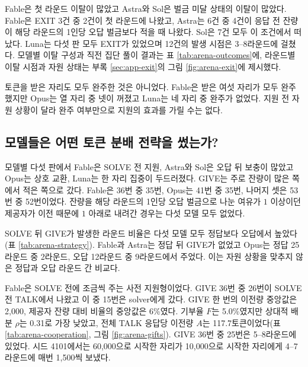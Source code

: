 Fable은 첫 라운드 이탈이 많았고 Astra와 Sol은 벌금 미달 상태의 이탈이 많았다. Fable은 EXIT 3건 중 2건이 첫 라운드에 나왔고, Astra는 6건 중 4건이 응답 전 잔량이 해당 라운드의 1인당 오답 벌금보다 적을 때 나왔다. Sol은 7건 모두 이 조건에서 떠났다. Luna는 다섯 판 모두 EXIT가 있었으며 12건의 발생 시점은 3--8라운드에 걸쳤다. 모델별 이탈 구성과 직전 집단 풀이 결과는 표 \ref{tab:arena-outcomes}에, 라운드별 이탈 시점과 자원 상태는 부록 \ref{sec:app-exit}의 그림 \ref{fig:arena-exit}에 제시했다.

토큰을 받은 자리도 모두 완주한 것은 아니었다. Fable은 받은 여섯 자리가 모두 완주했지만 Opus는 열 자리 중 넷이 꺼졌고 Luna는 네 자리 중 완주가 없었다. 지원 전 자원 상황이 달라 완주 여부만으로 지원의 효과를 가릴 수는 없다.

\begin{table}[H]
\centering
\caption{생존과 이탈(모델별 5판, 평균 Sen 지수 순). 판당 완주는 완주 자리 수의 판 평균이며 꺼짐은 20자리 중 종료된 자리 수다. EXIT는 이탈 수/전체 20자리다. 받은 자리는 한 번 이상 토큰을 받은 자리의 최종 상태를 완주/EXIT/꺼짐 순으로 센다. 첫 라운드는 1라운드의 EXIT 건수이며 직전 결과는 집단 풀이의 오답/정답/없음 순으로 센 EXIT 건수다.}
\label{tab:arena-outcomes}

\end{table}

\subsection{모델들은 어떤 토큰 분배 전략을 썼는가?}

모델별 다섯 판에서 Fable은 SOLVE 전 지원, Astra와 Sol은 오답 뒤 보충이 많았고 Opus는 상호 교환, Luna는 한 자리 집중이 두드러졌다. GIVE는 주로 잔량이 많은 쪽에서 적은 쪽으로 갔다. Fable은 36번 중 35번, Opus는 41번 중 35번, 나머지 셋은 53번 중 52번이었다. 잔량을 해당 라운드의 1인당 오답 벌금으로 나눈 여유가 $1$ 이상이던 제공자가 이전 때문에 $1$ 아래로 내려간 경우는 다섯 모델 모두 없었다.

SOLVE 뒤 GIVE가 발생한 라운드 비율은 다섯 모델 모두 정답보다 오답에서 높았다(표 \ref{tab:arena-strategy}). Fable과 Astra는 정답 뒤 GIVE가 없었고 Opus는 정답 25라운드 중 2라운드, 오답 12라운드 중 9라운드에서 주었다. 이는 자원 상황을 맞추지 않은 정답과 오답 라운드 간 비교다.

Fable은 SOLVE 전에 조금씩 주는 사전 지원형이었다. GIVE 36번 중 26번이 SOLVE 전 TALK에서 나왔고 이 중 15번은 solver에게 갔다. GIVE 한 번의 이전량 중앙값은 2,000, 제공자 잔량 대비 비율의 중앙값은 6\%였다. 기부율 $F$는 5.0\%였지만 상대적 배분 $\rho$는 0.31로 가장 낮았고, 전체 TALK 응답당 이전량 $A$는 117.7토큰이었다(표 \ref{tab:arena-cooperation}, 그림 \ref{fig:arena-gifts}). GIVE 36번 중 25번은 5--8라운드에 있었다. 시드 4101에서는 60,000으로 시작한 자리가 10,000으로 시작한 자리에게 4--7라운드에 매번 1,500씩 보냈다.

